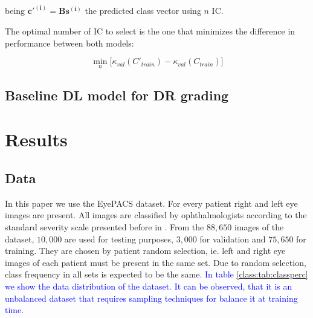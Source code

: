 \documentclass[review]{elsarticle}
\theoremstyle{definition} %
\theoremstyle{remark}
\begin{document}
being $\boldsymbol{c'^{(i)}} = \boldsymbol{B} \boldsymbol{s^{(i)}}$ the predicted class vector using $n$ IC.

The optimal number of IC to select is the one that minimizes the difference in performance between both models:

\begin{equation}
\min_{n} \big[ \kappa_{val} (C'_{train}) - \kappa_{val} (C_{train}) \big] 
\end{equation}

\subsection{Baseline DL model for DR grading}



\section{Results}\label{sec:results}

\subsection{Data}

In this paper we use the EyePACS dataset. For every patient right and left eye images are present. All images are classified by ophthalmologists according to the standard severity scale presented before in \cite{diaclass}. From the $88,650$ images of the dataset, $10,000$ are used for testing purposes, $3,000$ for validation and $75,650$ for training. They are chosen by patient random selection, ie. left and right eye images of each patient must be present in the same set. Due to random selection, class frequency in all sets is expected to be the same. \textcolor{blue}{In table \ref{class:tab:classperc} we show the data distribution of the dataset. It can be observed, that it is an unbalanced dataset that requires sampling techniques for balance it at training time.}
\end{document}
